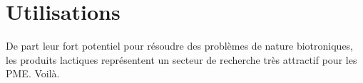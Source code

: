 \section{Utilisations}

De part leur fort potentiel pour résoudre des problèmes de nature biotroniques, les produits lactiques représentent un secteur de recherche très attractif pour les PME. Voilà.

